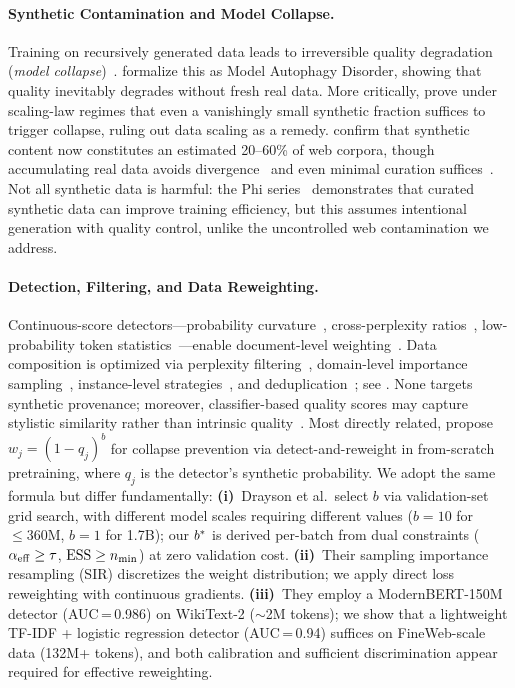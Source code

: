 \paragraph{Synthetic Contamination and Model Collapse.}
Training on recursively generated data leads to irreversible quality degradation (\emph{model collapse})~\citep{shumailov2024model}.
\citet{alemohammad2024mad} formalize this as Model Autophagy Disorder, showing that quality inevitably degrades without fresh real data.
More critically, \citet{dohmatob2025strong} prove under scaling-law regimes that even a vanishingly small synthetic fraction suffices to trigger collapse, ruling out data scaling as a remedy.
\citet{cheng2025contamination} confirm that synthetic content now constitutes an estimated 20--60\% of web corpora, though accumulating real data avoids divergence~\citep{kazdan2025collapse} and even minimal curation suffices~\citep{amin2025escaping}.
Not all synthetic data is harmful: the Phi series~\citep{gunasekar2023textbooks,li2023textbooks2} demonstrates that curated synthetic data can improve training efficiency, but this assumes intentional generation with quality control, unlike the uncontrolled web contamination we address.

\paragraph{Detection, Filtering, and Data Reweighting.}
Continuous-score detectors---probability curvature~\citep{mitchell2023detectgpt}, cross-perplexity ratios~\citep{hans2024binoculars}, low-probability token statistics~\citep{shi2024minkprob}---enable document-level weighting~\citep{wu2025survey}.
Data composition is optimized via perplexity filtering~\citep{wenzek2020ccnet}, domain-level importance sampling~\citep{xie2023doremi,xie2023dsir,grangier2025crisp,ye2025mixing}, instance-level strategies~\citep{bengio2009curriculum,mindermann2022prioritized,sow2025dynamic,engstrom2024dsdm}, and deduplication~\citep{abbas2023semdedup}; see \citet{albalak2024survey}.
None targets synthetic provenance; moreover, classifier-based quality scores may capture stylistic similarity rather than intrinsic quality~\citep{naitsaada2025illusion}.
Most directly related, \citet{drayson2025detection} propose $w_j = (1{-}q_j)^b$ for collapse prevention via detect-and-reweight in from-scratch pretraining, where $q_j$ is the detector's synthetic probability. We adopt the same formula but differ fundamentally:
\textbf{(i)}~Drayson et al.\ select $b$ via validation-set grid search, with different model scales requiring different values ($b{=}10$ for ${\leq}360$M, $b{=}1$ for 1.7B); our $b^*$ is derived per-batch from dual constraints ($\alpha_{\mathrm{eff}} \geq \tau$, $\mathrm{ESS} \geq n_{\min}$) at zero validation cost.
\textbf{(ii)}~Their sampling importance resampling (SIR) discretizes the weight distribution; we apply direct loss reweighting with continuous gradients.
\textbf{(iii)}~They employ a ModernBERT-150M detector (AUC\,=\,0.986) on WikiText-2 (${\sim}$2M tokens); we show that a lightweight TF-IDF + logistic regression detector (AUC\,=\,0.94) suffices on FineWeb-scale data (132M+ tokens), and both calibration and sufficient discrimination appear required for effective reweighting.

